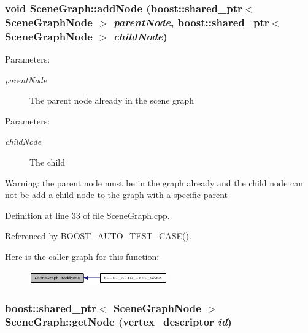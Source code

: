 \subsubsection{\setlength{\rightskip}{0pt plus 5cm}void SceneGraph::addNode (boost::shared\_\-ptr$<$ {\bf SceneGraphNode} $>$ {\em parentNode}, boost::shared\_\-ptr$<$ {\bf SceneGraphNode} $>$ {\em childNode})}\label{classSceneGraph_1c6ad1ade4f196573a0348fdab924bb0}


\begin{Desc}
\item[Parameters:]
\begin{description}
\item[{\em parentNode}]The parent node already in the scene graph \end{description}
\end{Desc}


\begin{Desc}
\item[Parameters:]
\begin{description}
\item[{\em childNode}]The child \end{description}
\end{Desc}
\begin{Desc}
\item[Warning:]the parent node must be in the graph already and the child node can not be add a child node to the graph with a specific parent \end{Desc}


Definition at line 33 of file SceneGraph.cpp.

Referenced by BOOST\_\-AUTO\_\-TEST\_\-CASE().

Here is the caller graph for this function:\nopagebreak
\begin{figure}[H]
\begin{center}
\leavevmode
\includegraphics[width=169pt]{classSceneGraph_1c6ad1ade4f196573a0348fdab924bb0_icgraph}
\end{center}
\end{figure}
\subsubsection{\setlength{\rightskip}{0pt plus 5cm}boost::shared\_\-ptr$<$ {\bf SceneGraphNode} $>$ SceneGraph::getNode (vertex\_\-descriptor {\em id})}\label{classSceneGraph_3d8dfec1bb4e175f87c0d44462140244}


